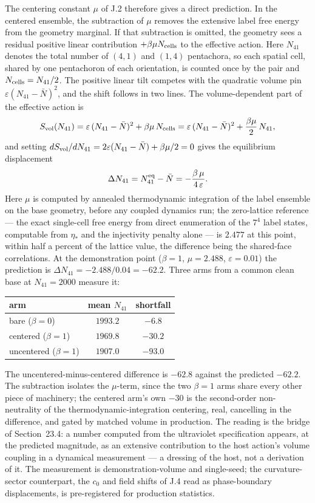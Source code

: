 \documentclass[11pt]{article}
\begin{document}
The centering constant $\mu$ of J.2 therefore gives a direct prediction. In the centered ensemble, the subtraction of $\mu$ removes the extensive label free energy from the geometry marginal. If that subtraction is omitted, the geometry sees a residual positive linear contribution $+\beta\mu N_{\rm cells}$ to the effective action. Here $N_{41}$ denotes the total number of $(4,1)$ and $(1,4)$ pentachora, so each spatial cell, shared by one pentachoron of each orientation, is counted once by the pair and $N_{\rm cells}=N_{41}/2$. The positive linear tilt competes with the quadratic volume pin $\varepsilon(N_{41}-\bar N)^2$, and the shift follows in two lines. The volume-dependent part of the effective action is
\[
S_{\rm vol}(N_{41})
=\varepsilon\,(N_{41}-\bar N)^2+\beta\mu\,N_{\rm cells}
=\varepsilon\,(N_{41}-\bar N)^2+\frac{\beta\mu}{2}\,N_{41},
\]
and setting $dS_{\rm vol}/dN_{41}=2\varepsilon(N_{41}-\bar N)+\beta\mu/2=0$ gives the equilibrium displacement
\[
\Delta N_{41}=N_{41}^{\rm eq}-\bar N=-\frac{\beta\,\mu}{4\,\varepsilon}.
\]
Here $\mu$ is computed by annealed thermodynamic integration of the label ensemble on the base geometry, before any coupled dynamics run; the zero-lattice reference --- the exact single-cell free energy from direct enumeration of the $7^4$ label states, computable from $\eta_*$ and the injectivity penalty alone --- is $2.477$ at this point, within half a percent of the lattice value, the difference being the shared-face correlations. At the demonstration point ($\beta=1$, $\mu=2.488$, $\varepsilon=0.01$) the prediction is $\Delta N_{41}=-2.488/0.04=-62.2$. Three arms from a common clean base at $N_{41}=2000$ measure it:

\begin{center}
{\small
\begin{tabular}{lcc}
\hline
arm & mean $N_{41}$ & shortfall \\
\hline
bare ($\beta=0$) & $1993.2$ & $-6.8$ \\
centered ($\beta=1$) & $1969.8$ & $-30.2$ \\
uncentered ($\beta=1$) & $1907.0$ & $-93.0$ \\
\hline
\end{tabular}
}
\end{center}

The uncentered-minus-centered difference is $-62.8$ against the predicted $-62.2$. The subtraction isolates the $\mu$-term, since the two $\beta=1$ arms share every other piece of machinery; the centered arm's own $-30$ is the second-order non-neutrality of the thermodynamic-integration centering, real, cancelling in the difference, and gated by matched volume in production. The reading is the bridge of Section~23.4: a number computed from the ultraviolet specification appears, at the predicted magnitude, as an extensive contribution to the host action's volume coupling in a dynamical measurement --- a dressing of the host, not a derivation of it. The measurement is demonstration-volume and single-seed; the curvature-sector counterpart, the $c_0$ and field shifts of J.4 read as phase-boundary displacements, is pre-registered for production statistics.
\end{document}
